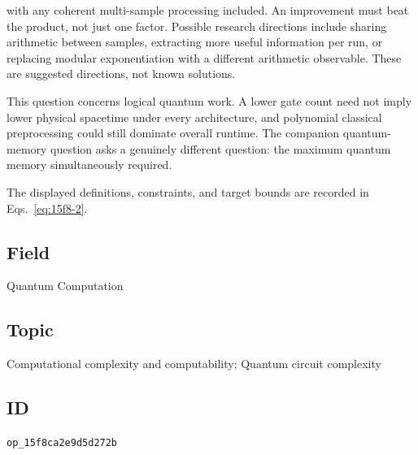 with any coherent multi-sample processing included. An improvement must beat the product, not just one factor. Possible research directions include sharing arithmetic between samples, extracting more useful information per run, or replacing modular exponentiation with a different arithmetic observable. These are suggested directions, not known solutions.

This question concerns logical quantum work. A lower gate count need not imply lower physical spacetime under every architecture, and polynomial classical preprocessing could still dominate overall runtime. The companion quantum-memory question asks a genuinely different question: the maximum quantum memory simultaneously required.

The displayed definitions, constraints, and target bounds are recorded in Eqs.~\eqref{eq:15f8-2}.

\subsection*{Field}

Quantum Computation

\subsection*{Topic}

Computational complexity and computability; Quantum circuit complexity

\subsection*{ID}

\texttt{op\_15f8ca2e9d5d272b}
